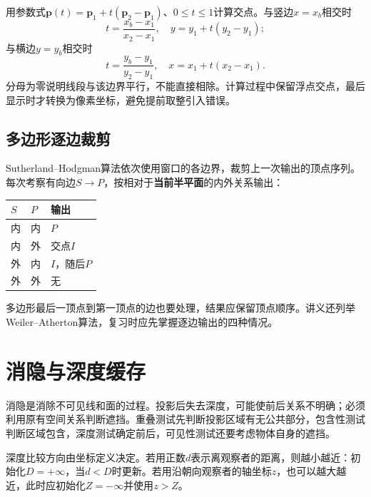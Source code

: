 用参数式$\boldsymbol p(t)=\boldsymbol p_1+t(\boldsymbol p_2-\boldsymbol p_1)$、$0\leq t\leq1$计算交点。与竖边$x=x_b$相交时
\[
t=\frac{x_b-x_1}{x_2-x_1},\quad y=y_1+t(y_2-y_1);
\]
与横边$y=y_b$相交时
\[
t=\frac{y_b-y_1}{y_2-y_1},\quad x=x_1+t(x_2-x_1).
\]
分母为零说明线段与该边界平行，不能直接相除。计算过程中保留浮点交点，最后显示时才转换为像素坐标，避免提前取整引入错误。


\subsection{多边形逐边裁剪}
Sutherland--Hodgman算法依次使用窗口的各边界，裁剪上一次输出的顶点序列。每次考察有向边$S\to P$，按相对于\textbf{当前半平面}的内外关系输出：
\begin{center}
\begin{tabular}{lll}
\toprule
$S$ & $P$ & 输出 \\
\midrule
内 & 内 & $P$ \\
内 & 外 & 交点$I$ \\
外 & 内 & $I$，随后$P$ \\
外 & 外 & 无 \\
\bottomrule
\end{tabular}
\end{center}
多边形最后一顶点到第一顶点的边也要处理，结果应保留顶点顺序。讲义还列举Weiler--Atherton算法，复习时应先掌握逐边输出的四种情况。

\section{消隐与深度缓存}
消隐是消除不可见线和面的过程。投影后失去深度，可能使前后关系不明确；必须利用原有空间关系判断遮挡。重叠测试先判断投影区域有无公共部分，包含性测试判断区域包含，深度测试确定前后，可见性测试还要考虑物体自身的遮挡。


深度比较方向由坐标定义决定。若用正数$d$表示离观察者的距离，则越小越近：初始化$D=+\infty$，当$d<D$时更新。若用沿朝向观察者的轴坐标$z$，也可以越大越近，此时应初始化$Z=-\infty$并使用$z>Z$。


